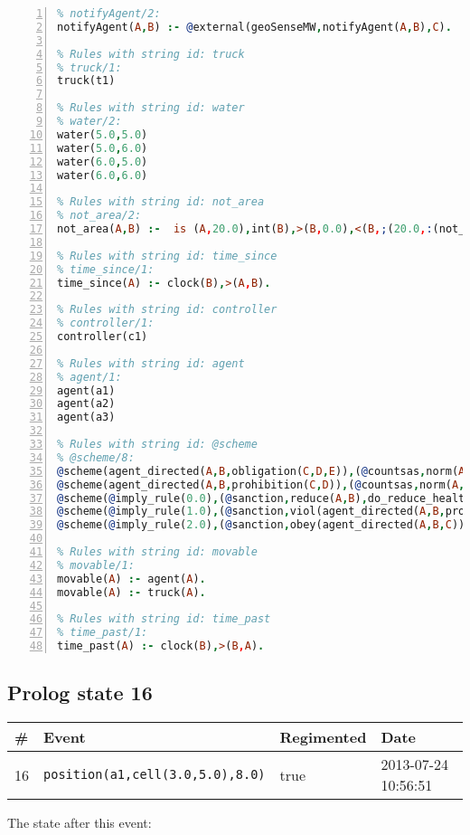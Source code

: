 \documentclass[11pt]{article}\usepackage[utf8]{inputenc}\usepackage{geometry}
\begin{document}
\begin{lstlisting}[language=Prolog, numbers=left]
% Rules with string id: notifyAgent
% notifyAgent/2:
notifyAgent(A,B) :- @external(geoSenseMW,notifyAgent(A,B),C).

% Rules with string id: truck
% truck/1:
truck(t1)

% Rules with string id: water
% water/2:
water(5.0,5.0)
water(5.0,6.0)
water(6.0,5.0)
water(6.0,6.0)

% Rules with string id: not_area
% not_area/2:
not_area(A,B) :-  is (A,20.0),int(B),>(B,0.0),<(B,;(20.0,:(not_area(A,B), is (-(B),20.0)))),int(A),>(A,0.0),<(A,;(20.0,:(area(A,B),-(int(A))))),int(B),>(A,0.0),>(B,0.0),<(A,21.0),<(B,21.0).

% Rules with string id: time_since
% time_since/1:
time_since(A) :- clock(B),>(A,B).

% Rules with string id: controller
% controller/1:
controller(c1)

% Rules with string id: agent
% agent/1:
agent(a1)
agent(a2)
agent(a3)

% Rules with string id: @scheme
% @scheme/8:
@scheme(agent_directed(A,B,obligation(C,D,E)),(@countsas,norm(A,B,F,obligation(C,D,E)),F),false,(listTrue(C)),(time_past(D)),false,[plus(viol(agent_directed(A,B,obligation(C,D,E))))|[]],[plus(obey(agent_directed(A,B,obligation(C,D,E))))|[]])
@scheme(agent_directed(A,B,prohibition(C,D)),(@countsas,norm(A,B,E,prohibition(C,D)),E),(listTrue(C)),false,(false),false,[plus(viol(agent_directed(A,B,prohibition(C,D))))|[]],[plus(obey(agent_directed(A,B,prohibition(C,D))))|[]])
@scheme(@imply_rule(0.0),(@sanction,reduce(A,B),do_reduce_health(A,B),notifyAgent(A,changed(status))),true,false,false,false,[min(reduce(A,B))|[]],[])
@scheme(@imply_rule(1.0),(@sanction,viol(agent_directed(A,B,prohibition(C,D))),do_sanction(D)),true,false,false,false,[min(viol(agent_directed(A,B,prohibition(C,D))))|[]],[])
@scheme(@imply_rule(2.0),(@sanction,obey(agent_directed(A,B,C))),true,false,false,false,[min(obey(agent_directed(A,B,C)))|[]],[])

% Rules with string id: movable
% movable/1:
movable(A) :- agent(A).
movable(A) :- truck(A).

% Rules with string id: time_past
% time_past/1:
time_past(A) :- clock(B),>(B,A).

\end{lstlisting}
\clearpage 
\subsection{Prolog state 16}
\begin{table}[ht]
\centering 
\begin{tabular}{l l l l} 
\textbf{\#} & \textbf{Event} & \textbf{Regimented} & \textbf{Date} \\ [0.5ex] 
\hline
16&\texttt{position(a1,cell(3.0,5.0),8.0)}&true&2013-07-24 10:56:51\\ [1ex] \hline\end{tabular}
\end{table}
The state after this event:
\end{document}
